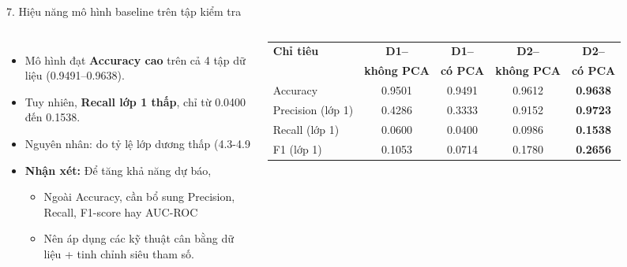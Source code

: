 \documentclass[aspectratio=169,11pt]{beamer}
\begin{document}
\begin{frame}{7. Hiệu năng mô hình baseline trên tập kiểm tra}
	
	\begin{columns}[T]
		
		
		\begin{itemize}
			\item Mô hình đạt \textbf{Accuracy cao} trên cả 4 tập dữ liệu
			(0.9491--0.9638).
			\item Tuy nhiên, \textbf{Recall lớp 1 thấp}, chỉ từ
			0.0400 đến 0.1538.			
			\item Nguyên nhân: do tỷ lệ lớp dương thấp (4.3-4.9%
			\item \textbf{Nhận xét:} Để tăng khả năng dự báo,
			\begin{itemize}
				\item Ngoài Accuracy, cần bổ sung Precision, Recall, F1-score  hay AUC-ROC
				\item Nên áp dụng các kỹ thuật cân bằng dữ liệu + tinh chỉnh siêu tham số.
			\end{itemize}
		\end{itemize}
		
		
		
		\centering
		
		\scriptsize
		
		\renewcommand{\arraystretch}{1.35}
		
		\begin{tabular}{lcccc}
			\hline
			\textbf{Chỉ tiêu}
			& \textbf{D1--} 
			& \textbf{D1--}
			& \textbf{D2--}
			& \textbf{D2--} \\
			& \textbf{không PCA}
			& \textbf{có PCA}
			& \textbf{không PCA}
			& \textbf{có PCA} \\
			\hline
			
			Accuracy
			& 0.9501
			& 0.9491
			& 0.9612
			& \textbf{0.9638} \\
			
			Precision (lớp 1)
			& 0.4286
			& 0.3333
			& 0.9152
			& \textbf{0.9723} \\
			
			Recall (lớp 1)
			& 0.0600
			& 0.0400
			& 0.0986
			& \textbf{0.1538} \\
			
			F1 (lớp 1)
			& 0.1053
			& 0.0714
			& 0.1780
			& \textbf{0.2656} \\
			

\end{tabular}
\end{columns}
\end{frame}
\end{document}
